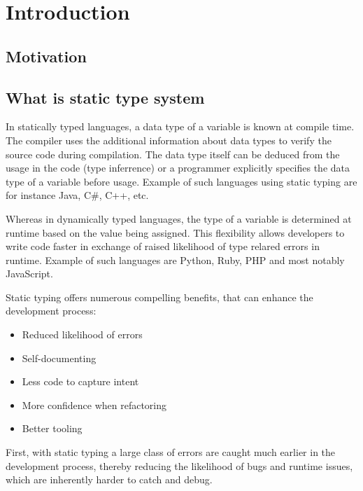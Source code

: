 \chapter{Introduction}

\section{Motivation}

\section{What is static type system}

In statically typed languages, a data type of a variable is known at compile time. The compiler uses the additional information about data types to verify the source code during compilation. The data type itself can be deduced from the usage in the code (type inferrence) or a programmer explicitly specifies the data type of a variable before usage. Example of such languages using static typing are for instance Java, C\#, C++, etc.

Whereas in dynamically typed languages, the type of a variable is determined at runtime based on the value being assigned. This flexibility allows developers to write code faster in exchange of raised likelihood of type relared errors in runtime. Example of such languages are Python, Ruby, PHP and most notably JavaScript.

Static typing offers numerous compelling benefits, that can enhance the development process:
\begin{itemize}
  \item Reduced likelihood of errors
  \item Self-documenting
  \item Less code to capture intent
  \item More confidence when refactoring
  \item Better tooling
\end{itemize}

First, with static typing a large class of errors are caught much earlier in the development process, thereby reducing the likelihood of bugs and runtime issues, which are inherently harder to catch and debug.

